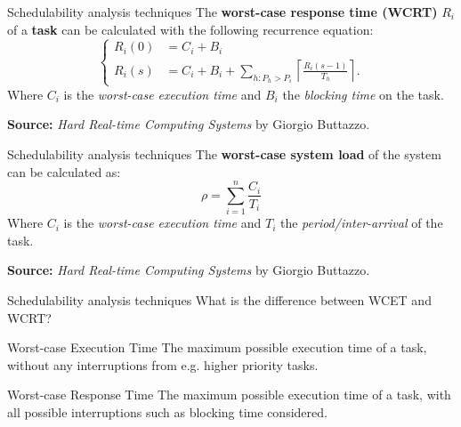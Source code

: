 \begin{frame}{Schedulability analysis techniques}
    The \textbf{worst-case response time (WCRT)} $R_i$ of a \textbf{task} can be calculated with
    the following recurrence equation:
    \begin{equation}
        \begin{cases}
            R_{i}(0) &= C_i + B_i \\
            R_{i}(s) &= C_i + B_i + \sum\limits_{h: P_h > P_i} \left\lceil \frac{R_{i}(s-1)}{T_h} \right\rceil.
        \end{cases}
    \end{equation}
    Where $C_i$ is the \emph{worst-case execution time} and $B_i$ the
    \emph{blocking time} on the task.
    \vspace{1em}

    \textbf{Source:} \emph{Hard Real-time Computing Systems} by Giorgio Buttazzo.
\end{frame}

\begin{frame}{Schedulability analysis techniques}
    The \textbf{worst-case system load} of the system can be calculated as:
    \begin{equation}
        \rho = \sum^{n}_{i=1} \frac{C_i}{T_i}
    \end{equation}
    Where $C_i$ is the \emph{worst-case execution time} and $T_i$ the
    \emph{period/inter-arrival} of the task.
    \vspace{1em}

    \textbf{Source:} \emph{Hard Real-time Computing Systems} by Giorgio Buttazzo.
\end{frame}

\begin{frame}{Schedulability analysis techniques}
    What is the difference between WCET and WCRT?
    \vspace{1em}

    \begin{block}{Worst-case Execution Time}
        The maximum possible execution time of a task, without any
        interruptions from e.g. higher priority tasks.
    \end{block}

    \vspace{1em}

    \begin{block}{Worst-case Response Time}
        The maximum possible execution time of a task, with all
        possible interruptions such as blocking time considered.
    \end{block}
\end{frame}

